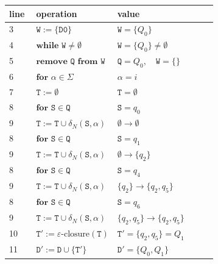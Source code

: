 \documentclass{article}
\begin{document}
\begin{minipage}[c]{0.59\textwidth}
\scriptsize
\setlength{\tabcolsep}{2pt}
\renewcommand{\arraystretch}{1.45}
\begin{tabular}{@{}p{0.13\linewidth}|p{0.39\linewidth}|p{}@{}}
\textbf{line} & \textbf{operation} & \textbf{value} \\
\hline
3 & \(\mathtt{W} := \{\mathtt{D0}\}\) & \(\mathtt{W}=\{Q_0\}\) \\
4 & \(\textbf{while }\mathtt{W}\ne\emptyset\) & \(\mathtt{W}=\{Q_0\}\ne\emptyset\) \\
5 & \(\textbf{remove }\mathtt{Q}\textbf{ from }\mathtt{W}\) & \(\mathtt{Q}=Q_0,\quad \mathtt{W}=\{\}\) \\
6 & \(\textbf{for }\alpha\in\Sigma\) & \(\alpha=i\) \\
7 & \(\mathtt{T} := \emptyset\) & \(\mathtt{T}=\emptyset\) \\
8 & \(\textbf{for }\mathtt{S}\in\mathtt{Q}\) & \(\mathtt{S}=q_0\) \\
9 & \(\mathtt{T} := \mathtt{T}\cup\delta_N(\mathtt{S},\alpha)\) & \(\emptyset\to\emptyset\) \\
8 & \(\textbf{for }\mathtt{S}\in\mathtt{Q}\) & \(\mathtt{S}=q_1\) \\
9 & \(\mathtt{T} := \mathtt{T}\cup\delta_N(\mathtt{S},\alpha)\) & \(\emptyset\to\{q_2\}\) \\
8 & \(\textbf{for }\mathtt{S}\in\mathtt{Q}\) & \(\mathtt{S}=q_4\) \\
9 & \(\mathtt{T} := \mathtt{T}\cup\delta_N(\mathtt{S},\alpha)\) & \(\{q_2\}\to\{q_2,q_5\}\) \\
8 & \(\textbf{for }\mathtt{S}\in\mathtt{Q}\) & \(\mathtt{S}=q_6\) \\
9 & \(\mathtt{T} := \mathtt{T}\cup\delta_N(\mathtt{S},\alpha)\) & \(\{q_2,q_5\}\to\{q_2,q_5\}\) \\
10 & \(\mathtt{T}' := \varepsilon\mbox{-closure}(\mathtt{T})\) & \(\mathtt{T}'=\{q_2,q_5\}=Q_1\) \\
11 & \(\mathtt{D}' := \mathtt{D}\cup\{\mathtt{T}'\}\) & \(\mathtt{D}'=\{Q_0,Q_1\}\) \\
\end{tabular}
\end{minipage}\hfill%
\begin{minipage}[c]{0.39\textwidth}
\centering
{}
\end{minipage}
\end{document}
